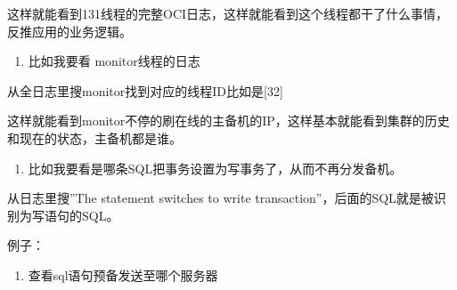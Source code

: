 \documentclass[a4,10pt,oneside,english]{sphinxmanual}
\begin{document}
这样就能看到131线程的完整OCI日志，这样就能看到这个线程都干了什么事情，反推应用的业务逻辑。
\begin{enumerate}
%
\setcounter{enumi}{1}
\item {} 
比如我要看 monitor线程的日志

\end{enumerate}

从全日志里搜monitor找到对应的线程ID比如是{[}32{]}

\begin{sphinxVerbatim}[commandchars=\\\{\}]
 \PYG{l+s+s2}{[32}\PYG{l+s+s2}{]}   
\end{sphinxVerbatim}

这样就能看到monitor不停的刷在线的主备机的IP，这样基本就能看到集群的历史和现在的状态，主备机都是谁。
\begin{enumerate}
%
\setcounter{enumi}{2}
\item {} 
比如我要看是哪条SQL把事务设置为写事务了，从而不再分发备机。

\end{enumerate}

从日志里搜”The statement switches to write transaction”，后面的SQL就是被识别为写语句的SQL。

例子：

\begin{sphinxVerbatim}[commandchars=\\\{\}]
\PYG{p}{[}\PYG{p}{]}\PYG{p}{[} \PYG{p}{]}                 
\end{sphinxVerbatim}
\begin{enumerate}
%
\setcounter{enumi}{3}
\item {} 
查看sql语句预备发送至哪个服务器

\end{enumerate}
\end{document}
